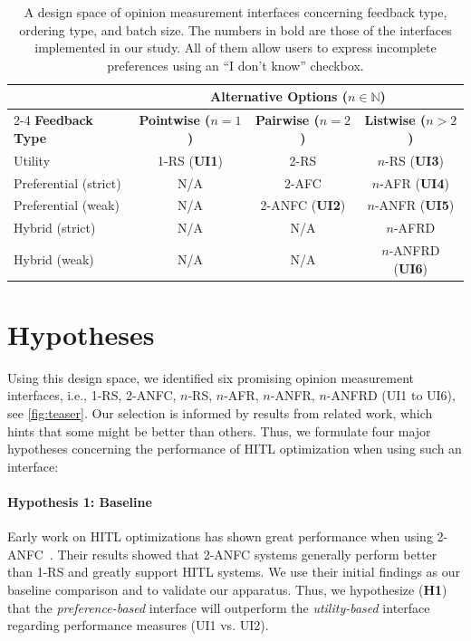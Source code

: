 \documentclass[acmsmall,screen,nonacm]{acmart}
\begin{document}
\begin{table}[t]
\caption{A design space of opinion measurement interfaces concerning feedback type, ordering type, and batch size. The numbers in bold are those of the interfaces implemented in our study. All of them allow users to express incomplete preferences using an ``I don't know'' checkbox.}
\centering
\begin{tabularx}{\linewidth}{Xccc}
\toprule
& \multicolumn{3}{c}{\textbf{Alternative Options ($n\in\mathbb{N}$)}} \\
\cmidrule(lr){2-4}
\textbf{Feedback Type} & \textbf{Pointwise ($n=1$)} & \textbf{Pairwise ($n=2$)} & \textbf{Listwise ($n>2$)} \\
\midrule
Utility & 1-RS (\textbf{UI1}) & 2-RS & $n$-RS (\textbf{UI3}) \\
Preferential (strict) & N/A & 2-AFC & $n$-AFR (\textbf{UI4}) \\
Preferential (weak) & N/A & 2-ANFC (\textbf{UI2}) & $n$-ANFR (\textbf{UI5}) \\
\midrule
Hybrid (strict) & N/A & N/A & $n$-AFRD \\
Hybrid (weak)   & N/A & N/A & $n$-ANFRD (\textbf{UI6}) \\
\bottomrule
\end{tabularx}
\label{tab:ui-options}
\end{table}

\section{Hypotheses}
\label{sec:hypothesis}
Using this design space, we identified six promising opinion measurement interfaces, i.e., 1-RS, 2-ANFC, $n$-RS, $n$-AFR, $n$-ANFR, $n$-ANFRD (UI1 to UI6), see \autoref{fig:teaser}. Our selection is informed by results from related work, which hints that some might be better than others. Thus, we formulate four major hypotheses concerning the performance of HITL optimization when using such an interface:

\paragraph{Hypothesis 1: Baseline}
Early work on HITL optimizations has shown great performance when using 2-ANFC~\cite{brochu2007active, brochu2007material-design, brochu2010animation}. Their results showed that 2-ANFC systems generally perform better than 1-RS and greatly support HITL systems. We use their initial findings as our baseline comparison and to validate our apparatus. Thus, we hypothesize (\textbf{H1}) that the \textit{preference-based} interface will outperform the \textit{utility-based} interface regarding performance measures (UI1 vs. UI2).
\end{document}
